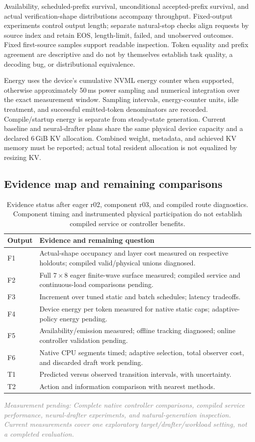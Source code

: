 \documentclass[10pt,twocolumn]{article}
\newcommand{\pending}[1]{\textcolor{gray}{\textit{Measurement pending: #1}}}
\begin{document}
Availability, scheduled-prefix survival, unconditional accepted-prefix survival, and actual verification-shape distributions accompany throughput. Fixed-output experiments control output length; separate natural-stop checks align requests by source index and retain EOS, length-limit, failed, and unobserved outcomes. Fixed first-source samples support readable inspection. Token equality and prefix agreement are descriptive and do not by themselves establish task quality, a decoding bug, or distributional equivalence.

Energy uses the device's cumulative NVML energy counter when supported, otherwise approximately 50\,ms power sampling and numerical integration over the exact measurement window. Sampling intervals, energy-counter units, idle treatment, and successful emitted-token denominators are recorded. Compile/startup energy is separate from steady-state generation. Current baseline and neural-drafter plans share the same physical device capacity and a declared 6\,GiB KV allocation. Combined weight, metadata, and achieved KV memory must be reported; actual total resident allocation is not equalized by resizing KV.

\subsection{Evidence map and remaining comparisons}
\begin{table}[!ht]
\centering\small
\caption{Evidence status after eager r02, component r03, and compiled route diagnostics. Component timing and instrumented physical participation do not establish compiled service or controller benefits.}
\begin{tabularx}{\linewidth}{@{}lX@{}}
\toprule
Output & Evidence and remaining question \\\midrule
F1 & Actual-shape occupancy and layer cost measured on respective holdouts; compiled valid/physical unions diagnosed.\\
F2 & Full $7\times8$ eager finite-wave surface measured; compiled service and continuous-load comparisons pending.\\
F3 & Increment over tuned static and batch schedules; latency tradeoffs.\\
F4 & Device energy per token measured for native static caps; adaptive-policy energy pending.\\
F5 & Availability/emission measured; offline tracking diagnosed; online controller validation pending.\\
F6 & Native CPU segments timed; adaptive selection, total observer cost, and discarded draft work pending.\\
T1 & Predicted versus observed transition intervals, with uncertainty.\\
T2 & Action and information comparison with nearest methods.\\
\bottomrule
\end{tabularx}
\end{table}
\pending{Complete native controller comparisons, compiled service performance, neural-drafter experiments, and natural-generation inspection. Current measurements cover one exploratory target/drafter/workload setting, not a completed evaluation.}
\end{document}
